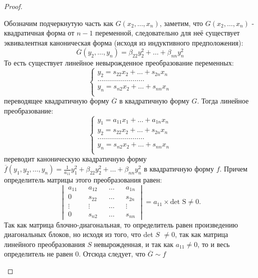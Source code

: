 \documentclass[../../main.tex]{subfiles}
\begin{document}
\begin{proof}
\begin{itemize}
	Обозначим подчеркнутую часть как $G(x_{2}, \dots, x_{n})$, заметим, что $G(x_{2}, \dots, x_{n})$ - квадратичная форма от $n - 1$ переменной, следовательно для неё существует эквивалентная каноническая форма (исходя из индуктивного предположения):
	\[
		\overline{G} (y_{2}, \dots, y_{n}) = \beta_{2 2} y^{2}_{2} + \dots + \beta_{n n} y^{2}_{n}
	\]
	То есть существует линейное невырожденное преобразование переменных:
	\[
	\begin{cases}
		y_{2} = s_{2 2} x_{2} + \dots + s_{2 n} x_{n} \\
		\dots\dots\dots\dots\dots\dots\dots\dots\\
		y_{n} = s_{n 2} x_{2} + \dots + s_{n n} x_{n} \\
	\end{cases}
	\]
	переводящее квадратичную форму $\overline{G}$ в квадратичную форму $G$. Тогда линейное преобразование:
	\[
	\begin{cases}
		y_{1} = a_{1 1} x_{1} + \dots + a_{1 n} x_{n} \\
		y_{2} = s_{2 2} x_{2} + \dots + s_{2 n} x_{n} \\
		\dots\dots\dots\dots\dots\dots\dots\dots\\
		y_{n} = s_{n 2} x_{2} + \dots + s_{n n} x_{n} \\
	\end{cases}
	\]
	переводит каноническую квадратичную форму $\overline{f} (y_{1}, y_{2}, \dots, y_{n}) = \frac{1}{a_{1 1}} y^{2}_{1} + \beta_{2 2} y^{2}_{2} + \dots + \beta_{n n} y^{2}_{n}$ в квадратичную форму $f$. Причем определитель матрицы этого преобразования равен:
	\[
		\begin{vmatrix}
			a_{1 1} && a_{1 2} && \dots && a_{1 n} \\
			0 && s_{2 2} && \dots && s_{2 n} \\
			\vdots && \vdots &&  \dots && \vdots \\
			0 && s_{n 2} && \dots && s_{n n}
		\end{vmatrix}
		= a_{1 1} \times \text{det S} \ne 0\text{.}
	\]
	Так как матрица блочно-диагональная, то определитель равен произведению диагональных блоков, но исходя из того, что det $S$ $\ne 0$, так как матрица линейного преобразования $S$ невырожденная, и так как $a_{1 1} \ne 0$, то и весь определитель не равен 0. Отсюда следует, что $\overline{G} \sim f$


\end{itemize}
\end{proof}
\end{document}
